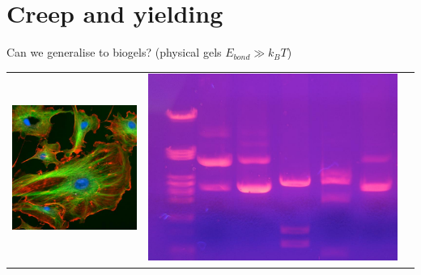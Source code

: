 \documentclass[xcolor=table]{beamer}
\begin{document}
\section*{Creep and yielding}



\begin{frame}{Can we generalise to biogels? \textup{\normalsize(physical gels
$E_{bond}\gg k_B T$)}}
\begin{tabu}{cX[c]c}
\includegraphics[height=0.3\textheight]{cell_mech} &
\includegraphics[height=0.3\textheight]{electrophoresis} &

\end{tabu}
\end{frame}
\end{document}

